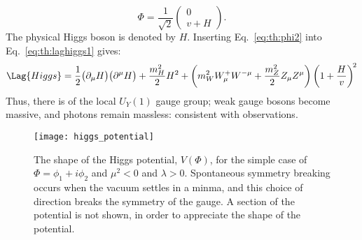 \begin{equation}
  \Phi = \frac{1}{\sqrt{2}}
  \begin{pmatrix} 0 \\ v+H
  \end{pmatrix}.
  \label{eq:th:phi2}
\end{equation}
The physical Higgs boson is denoted by $H$.
Inserting Eq.~\ref{eq:th:phi2} into Eq.~\ref{eq:th:laghiggs1} gives:
\begin{equation}
  \Lag{Higgs} =
  \frac{1}{2}\big(\partial_\mu H\big)\big(\partial^\mu H\big)
  +\frac{m_H^2}{2}H^2
  +\left(m_W^2W_\mu^+W^{-\mu} + \frac{m_Z^2}{2}Z_\mu Z^\mu\right)
  \left(1 + \frac{H}{v}\right)^{\!2}
  \label{eq:th:laghiggs2}
\end{equation}
Thus, there is \SSB of the local $U_Y(1)$ gauge group; weak gauge
bosons become massive, and photons remain massless: consistent with observations.

\begin{figure}
  \begin{center}
    \texttt{[image: higgs\_potential]}
    \caption[Shape of the Higgs potential]
    {
      The shape of the Higgs potential, $V(\Phi)$, for the simple case of $\Phi=\phi_1+i\phi_2$ and
      $\mu^2<0$ and $\lambda>0$.
      Spontaneous symmetry breaking occurs when the vacuum settles in a minma, and this choice of
      direction breaks the symmetry of the gauge.
      A section of the potential is not shown, in order to appreciate the shape of the potential.
    }
    \label{fig:th:higgspot}
  \end{center}
\end{figure}


